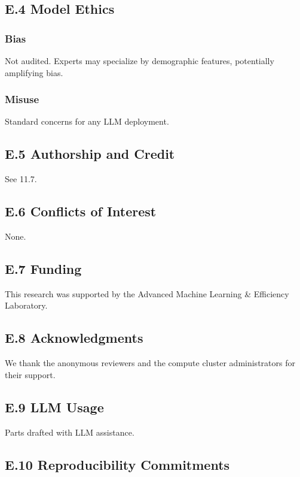 \subsection{E.4 Model Ethics}

\subsubsection{Bias}

Not audited. Experts may specialize by demographic features, potentially 
amplifying bias.

\subsubsection{Misuse}

Standard concerns for any LLM deployment.

\subsection{E.5 Authorship and Credit}

See  11.7.

\subsection{E.6 Conflicts of Interest}

None.

\subsection{E.7 Funding}

This research was supported by the Advanced Machine Learning \& Efficiency Laboratory.

\subsection{E.8 Acknowledgments}

We thank the anonymous reviewers and the compute cluster administrators for their support.

\subsection{E.9 LLM Usage}

Parts drafted with LLM assistance.

\subsection{E.10 Reproducibility Commitments}

